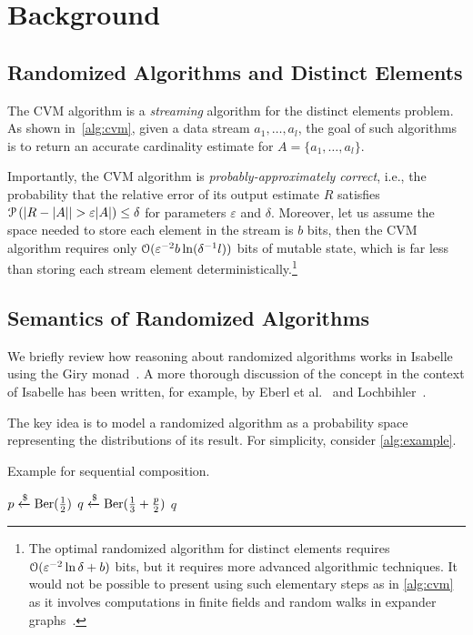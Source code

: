 \section{Background}
\label{sec:background}

\subsection{Randomized Algorithms and Distinct Elements}

The CVM algorithm is a \emph{streaming} algorithm for the distinct elements problem.
As shown in~\cref{alg:cvm}, given a data stream $a_1,\dots, a_l$, the goal of such algorithms is to return an accurate cardinality estimate for $A = \{a_1,\dots,a_l\}$.

Importantly, the CVM algorithm is \emph{probably-approximately correct}, i.e., the probability that the relative error of its output estimate $R$ satisfies $\operatorname{\mathcal P} \left( |R - |A| | > \varepsilon |A| \right) \leq \delta$ for parameters $\varepsilon$ and $\delta$.
Moreover, let us assume the space needed to store each element in the stream is $b$ bits, then the CVM algorithm requires only $\operatorname{\mathcal O}(\varepsilon^{-2} b \ln(\delta^{-1} l))$ bits of mutable state, which is far less than storing each stream element deterministically.\footnote{The optimal randomized algorithm for distinct elements requires $\operatorname{\mathcal O}( \varepsilon^{-2} \ln \delta + b)$ bits, but it requires more advanced algorithmic techniques. It would not be possible to present using such elementary steps as in \cref{alg:cvm} as it involves computations in finite fields and random walks in expander graphs~\cite{blasiok2020, karayel2023}.}

\subsection{Semantics of Randomized Algorithms}
We briefly review how reasoning about randomized algorithms works in Isabelle using the Giry monad~\cite{giry1982}.
A more thorough discussion of the concept in the context of Isabelle has been written, for example, by Eberl et al.~\cite{eberl2020} and Lochbihler~\cite{lochbihler2016}.

The key idea is to model a randomized algorithm as a probability space representing the distributions of its result.
For simplicity, consider \cref{alg:example}.
\begin{algorithm}[h!]
\caption{Example for sequential composition.}\label{alg:example}
\begin{algorithmic}[1]
\State $p \xleftarrow{\$} \operatorname{\mathrm{Ber}}(\frac{1}{2})$
\State $q \xleftarrow{\$} \operatorname{\mathrm{Ber}}(\frac{1}{3}+\frac{p}{2})$
\State \Return $q$
\end{algorithmic}
\end{algorithm}%

